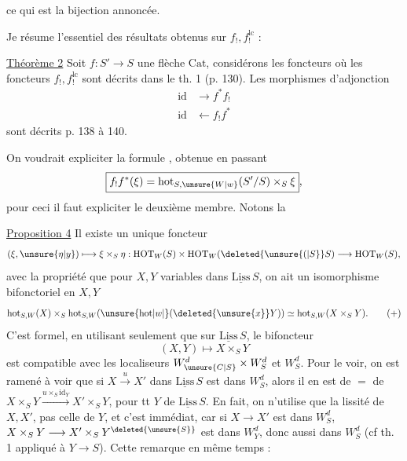  ce qui est la bijection annoncée.

Je résume l'essentiel des résultats obtenus sur $f_!,f_!^{\mathrm{lc}}$ :

\uline{Théorème 2} Soit $f:S'\longrightarrow S$ une flèche  $\mathrm{Cat}$, considérons les foncteurs
où les foncteurs $f_!,f_!^{\mathrm{lc}}$ sont décrits dans le th. 1 (p. 130). Les morphismes d'adjonction
\[
 \begin{aligned}
 \mathrm{id}&\longrightarrow f^*f_!\\
 \mathrm{id}&\longleftarrow f_!f^*
 \end{aligned}
\]
sont décrits p. 138 à 140.

On voudrait expliciter la formule , obtenue en passant
\[
 \boxed{f_!f^*(\xi)=\mathrm{hot}_{S,\unsure{W|w}}(S'/S)\times_S\xi},
\]
pour ceci il faut expliciter le deuxième membre. Notons la

\uline{Proposition 4} Il existe un unique foncteur
\[
 (\xi,\unsure{\eta|y})\longmapsto\xi\times_S\eta:\mathrm{HOT}_W(S)\times\mathrm{HOT}_W(\deleted{\unsure{(|S}}S)\longrightarrow\mathrm{HOT}_W(S),
\]
avec la propriété que pour $X,Y$ variables dans $\underline{\mathrm{Liss}}\,S$, on ait un isomorphisme bifonctoriel en $X,Y$
\[
 \mathrm{hot}_{S,W}(X)\times_S\mathrm{hot}_{S,W}(\unsure{\mathrm{hot}|w|{}}(\deleted{\unsure{x}}Y))\simeq\mathrm{hot}_{S,W}(X\times_S Y).
 \tag*{$(+)$}
\]
C'est formel, en utilisant seulement que sur $\underline{\mathrm{Liss}}\,S$, le bifoncteur
\[
 (X,Y)\longmapsto X\times_S Y
\]
est compatible avec les localiseurs $W_{\unsure{C|S}}^d\times W_S^d$ et $W_S^d$. Pour le voir, on est ramené à voir que si $X\xrightarrow{u}X'$ dans $\underline{\mathrm{Liss}}\,S$ est dans $W_S^d$, alors il en est de $=$ de $X\times_S Y\xrightarrow{u\times_S\mathrm{id}_Y}X'\times_S Y$,  pour tt
$Y$ de $\underline{\mathrm{Liss}}\,S$. En fait, on n'utilise que la lissité de $X,X'$, pas celle de $Y$, et c'est immédiat, car  si $X\longrightarrow X'$ est dans $W_S^d$, $X\times_S Y\longrightarrow X'\times_S Y^{\deleted{\unsure{S}}}$ est dans $W_Y^d$,  donc aussi dans $W_S^d$ (cf th. 1 appliqué à $Y\longrightarrow S$). Cette remarque   en même temps :

